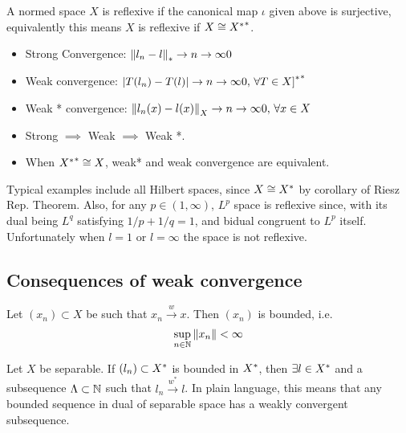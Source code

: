 \begin{definition}[Reflexive]\nl
A normed space $X$ is reflexive if the canonical map $\iota$ given above is surjective, equivalently this means $X$ is reflexive if $X\cong {{X}^*}^*$.   
\end{definition}

\begin{remark}[On $\dual{X}$]\hfill\rm
    \begin{itemize}
        \item Strong Convergence: $\left\|{l_n-l}\right\|_*\rightarrow{n\to\infty}{0}$
        \item Weak convergence: $|T(l_n)-T(l)|\rightarrow{n\to\infty}0,\,\forall T\in {{X]}^*}^*$
        \item Weak * convergence: $\left\|{l_n(x)-l(x)}\right\|_X\rightarrow{n\to\infty}0,\,\forall x\in X$
        \item Strong $\implies$ Weak $\implies$ Weak *.
        \item When ${{X}^*}^*\cong X$, weak* and weak convergence are equivalent.
    \end{itemize}
\end{remark}

\begin{example}\nl
Typical examples include all Hilbert spaces, since  $X\cong {X}^*$ by corollary of Riesz Rep. Theorem. Also, for any $p\in(1,\infty)$, $L^p$ space is reflexive since, with its dual being $L^q$ satisfying $1/p+1/q=1$, and bidual congruent to $L^p$ itself. Unfortunately when $l=1$ or $l=\infty$ the space is not reflexive.
\end{example}

\subsection{Consequences of weak convergence}
\begin{proposition}\nl
Let $(x_n)\subset X$ be such that $x_n\xrightarrow{w}x$. Then $(x_n)$ is bounded, i.e.
$$\sup_{n\in\mathbb{N}}\left\|{x_n}\right\|<\infty$$
\end{proposition}

\begin{theorem}\nl
    Let $X$ be separable. If $(l_n)\subset {X}^*$ is bounded in $\dual{X}$, then $\exists l\in{X}^*$ and a subsequence $\Lambda\subset\mathbb{N}$ such that $l_n\xrightarrow{w^*}l$. In plain language, this means that any bounded sequence in dual of separable space has a weakly convergent subsequence.
\end{theorem}

